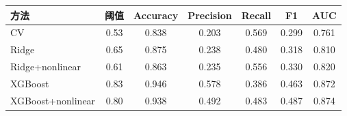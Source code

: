 \begin{tabular}{lcccccc}
\toprule
方法 & 阈值 & Accuracy & Precision & Recall & F1 & AUC \\ 
\midrule
CV & 0.53 & 0.838 & 0.203 & 0.569 & 0.299 & 0.761 \\ 
Ridge & 0.65 & 0.875 & 0.238 & 0.480 & 0.318 & 0.810 \\ 
Ridge+nonlinear & 0.61 & 0.863 & 0.235 & 0.556 & 0.330 & 0.820 \\ 
XGBoost & 0.83 & 0.946 & 0.578 & 0.386 & 0.463 & 0.872 \\ 
XGBoost+nonlinear & 0.80 & 0.938 & 0.492 & 0.483 & 0.487 & 0.874 \\ 
\bottomrule
\end{tabular}
